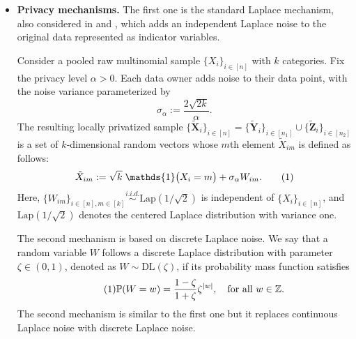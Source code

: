 \documentclass[twoside,11pt]{article}
\newcommand\numberthis{\addtocounter{equation}{1}\tag{\theequation}}
\newcommand{\rvLDPnoise}{W}
\newcommand{\numbersetRealizedLap}{w}
\newcommand{\rvOne}{X}
\newcommand{\vectorize}[1]{\mathbf{#1}}
\newcommand{\rvX}{X} %
\newcommand{\rVecX}{\vectorize{\rvX}}
\newcommand{\rvY}{Y}
\newcommand{\rVecY}{\vectorize{\rvY}}
\newcommand{\rvZ}{Z}
\newcommand{\rVecZ}{\vectorize{\rvZ}}
\newcommand{\mP}{\mathbb{P}} %
\newcommand{\sampleIndexOne}{i}
\newcommand{\alphabetSize}{k} %
\newcommand{\vectorIndex}{m}
\newcommand{\privacyParameter}{\alpha} %
\newcommand{\distparamDiscLap}{\zeta}%
\newcommand{\LapUParam}{\sigma_{\privacyParameter}}
\begin{document}
\begin{itemize}
	\item \textbf{Privacy mechanisms.}  The first one is the standard Laplace mechanism, also considered in \cite{Lam-Weil2021MinimaxConstraint} and \cite{Berrett2020Interactive}, which adds an independent Laplace noise to the original data represented as indicator variables.

 

\begin{definition}\label{def:LapU_formal}
	Consider a pooled raw multinomial sample $\{X_i\}_{i \in [n]}$ with $\alphabetSize$ categories. Fix the privacy level $\privacyParameter>0$. Each data owner adds noise to their data point, with the noise variance parameterized by
	$$
	\LapUParam
	:=
	\frac{2 \sqrt{2\alphabetSize}}{\privacyParameter}.
	$$
	The resulting locally privatized sample $\{\tilde{\rVecX}_{i}\}_{i \in [n]} = \{\tilde{\rVecY}_i\}_{i\in [n_1]} \cup \{\tilde{\rVecZ}_i\}_{i \in [n_2]}$ is a set of 
	$\alphabetSize$-dimensional random vectors whose $\vectorIndex$th element $\tilde{\rvOne}_{im}$ is defined as follows:
	\begin{align*}
		\tilde{\rvOne}_{im}
		:=
		\sqrt{\alphabetSize} \;
		\mathds{1}
		\bigl(
		\rvX_{\sampleIndexOne} = \vectorIndex
		\bigr)
		+
		\LapUParam
		W_{i\vectorIndex}.
		\numberthis \label{def:LapU}
	\end{align*}
	Here, $\{W_{i \vectorIndex}\}_{i \in [n], m \in [k]} \stackrel{i.i.d.}{\sim} \mathrm{Lap}(1/\sqrt{2})$ is independent of $\{X_i\}_{i \in [n]}$, and $\mathrm{Lap}(1/\sqrt{2})$ denotes the centered Laplace distribution with variance one. 
\end{definition}

The second mechanism is based on discrete Laplace noise. We say that a random variable $W$ follows a discrete Laplace distribution with parameter $\distparamDiscLap \in (0,1)$, denoted as $W \sim \mathrm{DL}(\distparamDiscLap)$, if its probability mass function satisfies
\begin{align*}\numberthis \label{def:discrete_laplace_distribution}
	\mP(\rvLDPnoise = \numbersetRealizedLap)
	=
	\frac{
		1-\distparamDiscLap
	}{
		1+\distparamDiscLap
	}
	\distparamDiscLap^{|\numbersetRealizedLap|}, 
	\quad 
	\text{for all $\numbersetRealizedLap \in \mathbb{Z}.$}
\end{align*}
The second mechanism is similar to the first one but it replaces continuous Laplace noise with discrete Laplace noise. 


\end{itemize}
\end{document}
